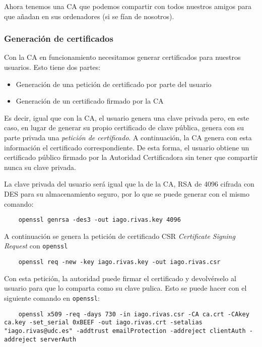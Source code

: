 Ahora tenemos una CA que podemos compartir con todos nuestros amigos para que añadan en sus ordenadores (si se fían de nosotros).

\subsubsection{Generación de certificados}

Con la CA en funcionamiento necesitamos generar certificados para nuestros usuarios. Esto tiene dos partes:

\begin{itemize}
    \item Generación de una petición de certificado por parte del usuario
    \item Generación de un certificado firmado por la CA
\end{itemize}

Es decir, igual que con la CA, el usuario genera una clave privada pero, en este caso, en lugar de generar su propio certificado de clave pública, genera con su parte privada una \textit{petición de certificado}. A continuación, la CA genera con esta información el certificado correspondiente. De esta forma, el usuario obtiene un certificado público firmado por la Autoridad Certificadora sin tener que compartir nunca su clave privada.

La clave privada del usuario será igual que la de la CA, RSA de 4096 cifrada con DES para su almacenamiento seguro, por lo que se puede generar con el mismo comando:

\begin{verbatim}
    openssl genrsa -des3 -out iago.rivas.key 4096
\end{verbatim}

A continuación se genera la petición de certificado CSR \textit{Certificate Signing Request} con \texttt{openssl}

\begin{verbatim}
    openssl req -new -key iago.rivas.key -out iago.rivas.csr
\end{verbatim}

Con esta petición, la autoridad puede firmar el certificado y devolvérselo al usuario para que lo comparta como su clave pulica. Esto se puede hacer con el siguiente comando en \texttt{openssl}:

\begin{verbatim}
    openssl x509 -req -days 730 -in iago.rivas.csr -CA ca.crt -CAkey ca.key -set_serial 0xBEEF -out iago.rivas.crt -setalias "iago.rivas@udc.es" -addtrust emailProtection -addreject clientAuth -addreject serverAuth
\end{verbatim}

